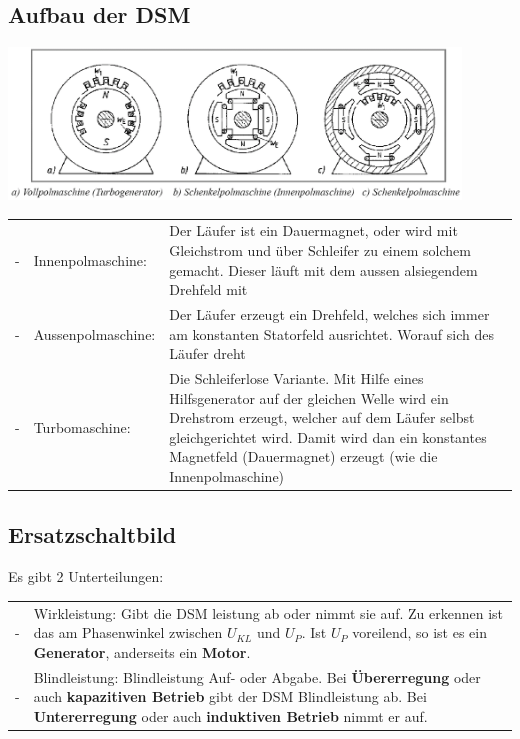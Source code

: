 	\subsection{Aufbau der DSM}
		\includegraphics[width=12cm]{./images/Aufbau_DSM.png}\\
		\begin{tabular}{ p{1cm} p{4cm} p{10cm}}
			- & Innenpolmaschine: & Der Läufer ist ein Dauermagnet, oder wird mit
			Gleichstrom und über Schleifer zu einem solchem gemacht. Dieser läuft mit dem aussen
			alsiegendem Drehfeld mit\\
			- & Aussenpolmaschine: & Der Läufer erzeugt ein Drehfeld, welches sich immer
			am konstanten Statorfeld ausrichtet. Worauf sich des Läufer dreht\\
			- & Turbomaschine: & Die Schleiferlose Variante. Mit Hilfe eines
			Hilfsgenerator auf der gleichen Welle wird ein Drehstrom erzeugt, welcher
			auf dem Läufer selbst gleichgerichtet wird. Damit wird dan ein konstantes
			Magnetfeld (Dauermagnet) erzeugt (wie die Innenpolmaschine)\\
		\end{tabular}
	\subsection{Ersatzschaltbild}
		\begin{minipage}{11cm}
			Es gibt 2 Unterteilungen:\\
			\begin{tabular}{p{1cm} p{9cm}}
			    -& Wirkleistung: Gibt die DSM leistung ab oder nimmt sie auf. Zu erkennen
			    ist das am Phasenwinkel zwischen $U_{KL}$ und $U_P$. Ist $U_P$ voreilend, so ist
				es ein \textbf{Generator}, anderseits ein \textbf{Motor}.\\
				-& Blindleistung: Blindleistung Auf- oder Abgabe. Bei
				\textbf{Übererregung} oder auch \textbf{kapazitiven Betrieb} gibt der
				DSM Blindleistung ab. Bei \textbf{Untererregung} oder auch \textbf{induktiven Betrieb} nimmt er auf.\\
			\end{tabular}
	    \end{minipage}
		\begin{minipage}{8cm}
	    \end{minipage}\\
	
